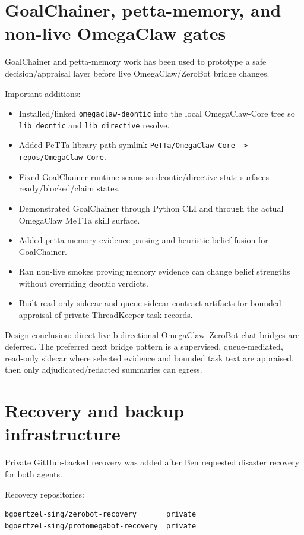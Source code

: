 \documentclass[11pt]{article}
\begin{document}
\section{GoalChainer, petta-memory, and non-live OmegaClaw gates}

GoalChainer and petta-memory work has been used to prototype a safe decision/appraisal layer before live OmegaClaw/ZeroBot bridge changes.

Important additions:
\begin{itemize}
  \item Installed/linked \texttt{omegaclaw-deontic} into the local OmegaClaw-Core tree so \texttt{lib\_deontic} and \texttt{lib\_directive} resolve.
  \item Added PeTTa library path symlink \texttt{PeTTa/OmegaClaw-Core -> repos/OmegaClaw-Core}.
  \item Fixed GoalChainer runtime seams so deontic/directive state surfaces ready/blocked/claim states.
  \item Demonstrated GoalChainer through Python CLI and through the actual OmegaClaw MeTTa skill surface.
  \item Added petta-memory evidence parsing and heuristic belief fusion for GoalChainer.
  \item Ran non-live smokes proving memory evidence can change belief strengths without overriding deontic verdicts.
  \item Built read-only sidecar and queue-sidecar contract artifacts for bounded appraisal of private ThreadKeeper task records.
\end{itemize}

Design conclusion: direct live bidirectional OmegaClaw--ZeroBot chat bridges are deferred.  The preferred next bridge pattern is a supervised, queue-mediated, read-only sidecar where selected evidence and bounded task text are appraised, then only adjudicated/redacted summaries can egress.

\section{Recovery and backup infrastructure}

Private GitHub-backed recovery was added after Ben requested disaster recovery for both agents.

Recovery repositories:
\begin{verbatim}
bgoertzel-sing/zerobot-recovery       private
bgoertzel-sing/protomegabot-recovery  private
\end{verbatim}
\end{document}

